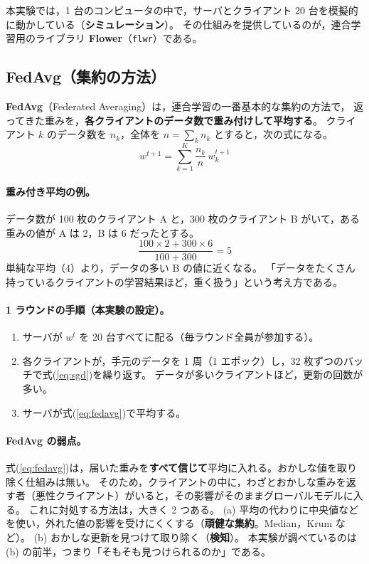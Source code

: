\documentclass[a4j, dvipdfmx]{jsarticle}  %
\begin{document}
本実験では，1 台のコンピュータの中で，サーバとクライアント 20 台を模擬的に動かしている（\textbf{シミュレーション}）。
その仕組みを提供しているのが，連合学習用のライブラリ \textbf{Flower}（\texttt{flwr}）である。

\subsection{FedAvg（集約の方法）}
\label{sec:fedavg}

\textbf{FedAvg}（Federated Averaging）は，連合学習の一番基本的な集約の方法で，
返ってきた重みを，\textbf{各クライアントのデータ数で重み付けして平均する}。
クライアント $k$ のデータ数を $n_k$，全体を $n = \sum_k n_k$ とすると，次の式になる。
\begin{equation}
  w^{t+1} = \sum_{k=1}^{K} \frac{n_k}{n}\, w_k^{t+1}
  \label{eq:fedavg}
\end{equation}

\paragraph{重み付き平均の例。}
データ数が 100 枚のクライアント A と，300 枚のクライアント B がいて，ある重みの値が A は 2，B は 6 だったとする。
\[
  \frac{100 \times 2 + 300 \times 6}{100 + 300} = 5
\]
単純な平均（4）より，データの多い B の値に近くなる。
「データをたくさん持っているクライアントの学習結果ほど，重く扱う」という考え方である。

\paragraph{1 ラウンドの手順（本実験の設定）。}
\begin{enumerate}
  \item サーバが $w^t$ を 20 台すべてに配る（毎ラウンド全員が参加する）。
  \item 各クライアントが，手元のデータを 1 周（1 エポック）し，32 枚ずつのバッチで式(\ref{eq:sgd})を繰り返す。
        データが多いクライアントほど，更新の回数が多い。
  \item サーバが式(\ref{eq:fedavg})で平均する。
\end{enumerate}

\paragraph{FedAvg の弱点。}
式(\ref{eq:fedavg})は，届いた重みを\textbf{すべて信じて}平均に入れる。おかしな値を取り除く仕組みは無い。
そのため，クライアントの中に，わざとおかしな重みを返す者（悪性クライアント）がいると，その影響がそのままグローバルモデルに入る。
これに対処する方法は，大きく 2 つある。
(a) 平均の代わりに中央値などを使い，外れた値の影響を受けにくくする（\textbf{頑健な集約}。Median，Krum など）。
(b) おかしな更新を見つけて取り除く（\textbf{検知}）。
本実験が調べているのは (b) の前半，つまり「そもそも見つけられるのか」である。
\end{document}
